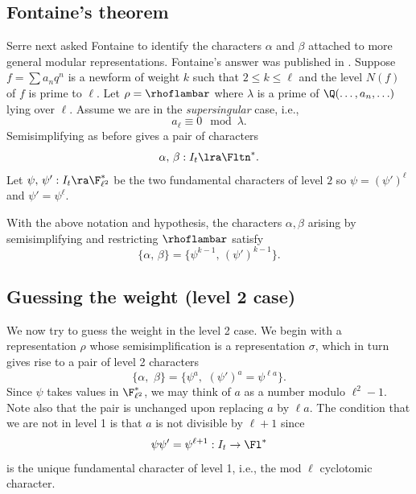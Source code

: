 \documentclass{report}
\begin{document}
\subsection{Fontaine's theorem}
Serre next asked Fontaine to identify the characters
$\alpha$ and $\beta$ attached to more general modular
representations.  Fontaine's answer was published in
\cite{edixhoven:weight}.
Suppose $f=\sum a_n q^n$ is a
newform of weight $k$ such that $2\leq k\leq \ell$
and the level $N(f)$ of $f$ is prime to $\ell$.
Let $\rho=\rhoflambar$ where $\lambda$ is a prime of
$\Q(\ldots,a_n,\ldots)$ lying over $\ell$.
Assume we are in the {\em supersingular} case, i.e.,
      $$a_\ell\equiv 0 \mod \lambda.$$
Semisimplifying as before gives a pair of characters
 $$\alpha,\, \beta:I_t\lra \Fltn^*.$$
Let $\psi,\, \psi':I_t\ra \F_{\ell^2}^*$
be the two fundamental characters of level $2$
so $\psi=(\psi')^\ell$ and $\psi'=\psi^\ell$.
\begin{theorem}\label{edixfontaine}
With the above notation and hypothesis,
the characters $\alpha, \beta$ arising by
semisimplifying and restricting  $\rhoflambar$ satisfy
     $$\{\alpha,\,\beta\} = \{\psi^{k-1},\,(\psi')^{k-1}\}.$$
\end{theorem}

\subsection{Guessing the weight (level 2 case)}
We now try to guess the weight in the level 2 case.
We begin with a representation $\rho$ whose semisimplification
is a representation $\sigma$, which in turn gives
rise to a pair of level 2 characters
$$\{\alpha,\,\,\beta\}=\{\psi^a,\,\, (\psi')^a=\psi^{\ell{}a}\}.$$
Since $\psi$ takes values in $\F_{\ell^2}^*$, we may think
of $a$ as a number modulo $\ell^2-1$.  Note also
that the pair is unchanged upon replacing $a$ by $\ell{}a$.
The condition that we are not in
level 1 is that $a$ is not divisible by
$\ell+1$ since
  $$\psi\psi'=\psi^{\ell+1}:I_t\rightarrow\Fl^*$$
is the unique fundamental character of level 1,
i.e., the mod $\ell$ cyclotomic character.
\end{document}
